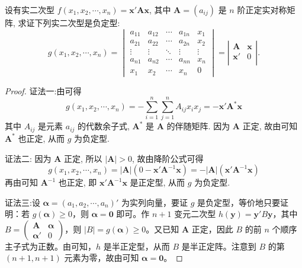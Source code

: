 \documentclass[../../main.tex]{subfiles}%
\begin{document}
\begin{proposition}\label{proposition:利用正定阵构造负定二次型}
设有实二次型 \(f(x_1,x_2,\cdots,x_n)=\boldsymbol{x}'\boldsymbol{A}\boldsymbol{x}\), 其中 \(\boldsymbol{A}=(a_{ij})\) 是 \(n\) 阶正定实对称矩阵, 求证下列实二次型是负定型:
\[g(x_1,x_2,\cdots,x_n)=\begin{vmatrix}
a_{11}&a_{12}&\cdots&a_{1n}&x_1\\
a_{21}&a_{22}&\cdots&a_{2n}&x_2\\
\vdots&\vdots&\ddots&\vdots&\vdots\\
a_{n1}&a_{n2}&\cdots&a_{nn}&x_n\\
x_1&x_2&\cdots&x_n&0
\end{vmatrix}=\left| \begin{matrix}
	\boldsymbol{A}&		\boldsymbol{x}\\
	\boldsymbol{x}'&		0\\
\end{matrix} \right|.
\]
\end{proposition}
\begin{proof}

{\color{blue}证法一:}由可得
\[g(x_1,x_2,\cdots,x_n)=-\sum_{i = 1}^{n}\sum_{j = 1}^{n}A_{ij}x_ix_j=-\boldsymbol{x}'\boldsymbol{A}^*\boldsymbol{x}\]
其中 \(A_{ij}\) 是元素 \(a_{ij}\) 的代数余子式, \(\boldsymbol{A}^*\) 是 \(\boldsymbol{A}\) 的伴随矩阵. 因为 \(\boldsymbol{A}\) 正定, 故由可知 \(\boldsymbol{A}^*\) 也正定, 从而 \(g\) 为负定型.

{\color{blue}证法二:} 因为 \(\boldsymbol{A}\) 正定, 所以 \(|\boldsymbol{A}|>0\), 故由降阶公式可得
\[g(x_1,x_2,\cdots,x_n)=|\boldsymbol{A}|(0 - \boldsymbol{x}'\boldsymbol{A}^{-1}\boldsymbol{x})=-|\boldsymbol{A}|(\boldsymbol{x}'\boldsymbol{A}^{-1}\boldsymbol{x})\]
再由可知 \(\boldsymbol{A}^{-1}\) 也正定, 即 \(\boldsymbol{x}'\boldsymbol{A}^{-1}\boldsymbol{x}\) 是正定型, 从而 \(g\) 为负定型.

{\color{blue}证法三:}设 $\boldsymbol{\alpha}=(a_1,a_2,\cdots,a_n)'$ 为实列向量，要证 $g$ 是负定型，等价地只要证明：若 $g(\boldsymbol{\alpha})\geqslant 0$，则 $\boldsymbol{\alpha}=\boldsymbol{0}$ 即可。作 $n + 1$ 变元二次型 $h(\boldsymbol{y})=\boldsymbol{y}'B\boldsymbol{y}$，其中 $B = \begin{pmatrix}
\boldsymbol{A} & \boldsymbol{\alpha} \\
\boldsymbol{\alpha}' & 0
\end{pmatrix}$，则 $|B| = g(\boldsymbol{\alpha})\geqslant 0$。又已知 $\boldsymbol{A}$ 正定，因此 $B$ 的前 $n$ 个顺序主子式为正数。由可知，$h$ 是半正定型，从而 $B$ 是半正定阵。注意到 $B$ 的第 $(n + 1,n + 1)$ 元素为零，故由可知 $\boldsymbol{\alpha}=\boldsymbol{0}$。

\end{proof}
\end{document}
